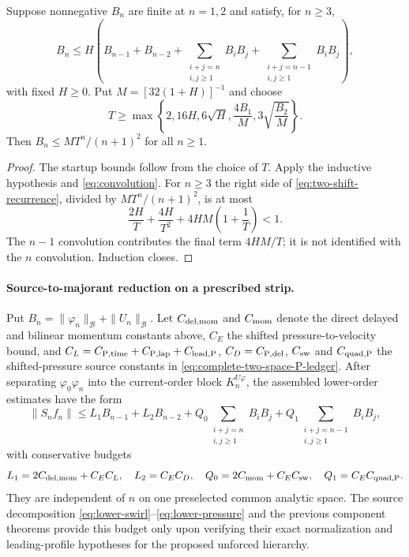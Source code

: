 \begin{proposition}
\label{prop:two-shift-majorant}
Suppose nonnegative $B_n$ are finite at $n=1,2$ and satisfy, for $n\ge3$,
\begin{equation}\label{eq:two-shift-recurrence}
 B_n\le H\left(
 B_{n-1}+B_{n-2}+
 \sum_{\substack{i+j=n\\i,j\ge1}}B_iB_j+
 \sum_{\substack{i+j=n-1\\i,j\ge1}}B_iB_j\right),
\end{equation}
with fixed $H\ge0$. Put $M=[32(1+H)]^{-1}$ and choose
\[
 T\ge\max\left\{2,16H,6\sqrt H,\frac{4B_1}{M},
 3\sqrt{\frac{B_2}{M}}\right\}.
\]
Then $B_n\le MT^n/(n+1)^2$ for all $n\ge1$.
\end{proposition}
\begin{proof}
The startup bounds follow from the choice of $T$.
Apply the inductive hypothesis and \eqref{eq:convolution}.
For $n\ge3$ the right side of \eqref{eq:two-shift-recurrence},
divided by $MT^n/(n+1)^2$, is at most
\[
 \frac{2H}{T}+\frac{4H}{T^2}
 +4HM\left(1+\frac1T\right)<1.
\]
The $n-1$ convolution contributes the final term $4HM/T$;
it is not identified with the $n$ convolution. Induction closes.
\end{proof}

\paragraph{Source-to-majorant reduction on a prescribed strip.}
Put $B_n=\|\varphi_n\|_{\mathcal B}+\|U_n\|_{\mathcal B}$.
Let $C_{\rm del,mom}$ and $C_{\rm mom}$ denote the direct delayed
and bilinear momentum constants above, $C_E$ the shifted
pressure-to-velocity bound, and
$C_L=C_{\rm P,time}+C_{\rm P,lap}+C_{\rm lead,P}$,
$C_D=C_{\rm P,del}$, $C_{\rm sw}$ and $C_{\rm quad,P}$
the shifted-pressure source constants in
\eqref{eq:complete-two-space-P-ledger}. After separating
$\varphi_0\varphi_n$ into the current-order block $K_n^{U\varphi}$,
the assembled lower-order estimates have the form
\begin{equation}\label{eq:fixed-radius-source-budget}
 \|S_nf_n\|\le L_1B_{n-1}+L_2B_{n-2}
 +Q_0\!\sum_{\substack{i+j=n\\i,j\ge1}}B_iB_j
 +Q_1\!\sum_{\substack{i+j=n-1\\i,j\ge1}}B_iB_j,
\end{equation}
with conservative budgets
\[
 L_1=2C_{\rm del,mom}+C_EC_L,\quad
 L_2=C_EC_D,\quad
 Q_0=2C_{\rm mom}+C_EC_{\rm sw},\quad
 Q_1=C_EC_{\rm quad,P}.
\]
They are independent of $n$ on one preselected common analytic
space. The source decomposition
\eqref{eq:lower-swirl}--\eqref{eq:lower-pressure}
and the previous component theorems provide this budget only
upon verifying their exact normalization and leading-profile
hypotheses for the proposed unforced hierarchy.

